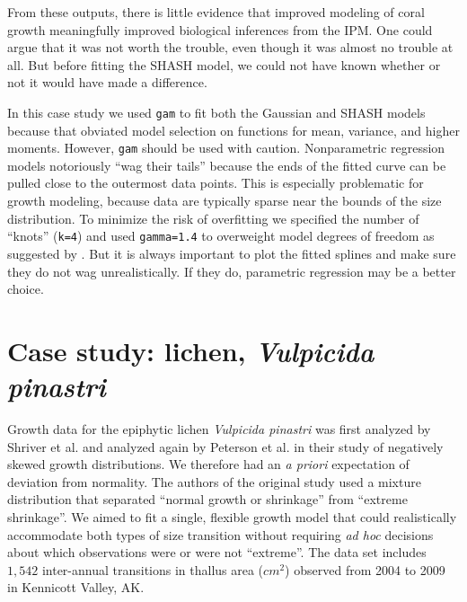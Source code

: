 \documentclass[12pt]{article}
\begin{document}
From these outputs, there is little evidence that improved modeling of coral growth meaningfully improved biological inferences from the IPM. 
One could argue that it was not worth the trouble, even though it was almost no trouble at all. But before 
fitting the SHASH model, we could not have known whether or not it would have made a difference.

In this case study we used \texttt{gam} to fit both the Gaussian and SHASH models because that obviated model selection on functions for mean, variance, and higher moments. 
However, \texttt{gam} should be used with caution. 
Nonparametric regression models notoriously ``wag their tails'' because the ends of the fitted curve can be pulled close to the outermost data points. 
This is especially problematic for growth modeling, because data are typically sparse near the bounds of the size distribution. 
To minimize the risk of overfitting we specified the number of ``knots'' (\texttt{k=4}) and used \texttt{gamma=1.4} to overweight model degrees of freedom as suggested by \citet[][sec. 3.2]{gu-2013}. 
But it is always important to plot the fitted splines and make sure they do not wag unrealistically. 
If they do, parametric regression may be a better choice. 

\section{Case study: lichen, \emph{Vulpicida pinastri}}
Growth data for the epiphytic lichen \emph{Vulpicida pinastri} was first analyzed by Shriver et al. \citeyear{shriver2012comparative} and analyzed again by Peterson et al. \citeyear{peterson2019improving} in their study of negatively skewed growth distributions. 
We therefore had an \emph{a priori} expectation of deviation from normality. 
The authors of the original study used a mixture distribution that separated ``normal growth or shrinkage'' from ``extreme shrinkage''. 
We aimed to fit a single, flexible growth model that could realistically accommodate both types of size transition without requiring \emph{ad hoc} decisions about which observations were or were not ``extreme''.
The data set includes $1,542$ inter-annual transitions in thallus area ($cm^2$) observed from 2004 to 2009 in Kennicott Valley, AK. 
\end{document}

